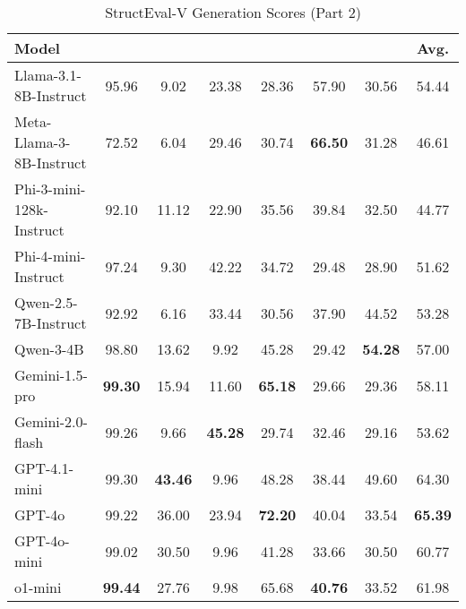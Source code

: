 \begin{table*}[ht]
\centering
\scriptsize
\begin{tabular*}{\textwidth}{@{\extracolsep{\fill}}l*{6}{S[table-format=3.2]}S[table-format=3.2]}
\toprule
\textbf{Model} &
 &
 &
 &
  &
   &
 &
\textbf{Avg.}\\
\midrule
Llama-3.1-8B-Instruct   & 95.96 &  9.02 & 23.38 & 28.36 & 57.90 & 30.56 & 54.44 \\
Meta-Llama-3-8B-Instruct& 72.52 &  6.04 & 29.46 & 30.74 & \textbf{66.50} & 31.28 & 46.61 \\
Phi-3-mini-128k-Instruct& 92.10 & 11.12 & 22.90 & 35.56 & 39.84 & 32.50 & 44.77 \\
Phi-4-mini-Instruct      & 97.24 &  9.30 & 42.22 & 34.72 & 29.48 & 28.90 & 51.62 \\
Qwen-2.5-7B-Instruct     & 92.92 &  6.16 & 33.44 & 30.56 & 37.90 & 44.52 & 53.28 \\
Qwen-3-4B              & 98.80 & 13.62 &  9.92 & 45.28 & 29.42 & \textbf{54.28} & 57.00 \\
Gemini-1.5-pro         & \textbf{99.30} & 15.94 & 11.60 & \textbf{65.18} & 29.66 & 29.36 & 58.11 \\
Gemini-2.0-flash       & 99.26 &  9.66 & \textbf{45.28} & 29.74 & 32.46 & 29.16 & 53.62 \\
GPT-4.1-mini           & 99.30 & \textbf{43.46} &  9.96 & 48.28 & 38.44 & 49.60 & 64.30 \\
GPT-4o                 & 99.22 & 36.00 & 23.94 & \textbf{72.20} & 40.04 & 33.54 & \textbf{65.39} \\
GPT-4o-mini            & 99.02 & 30.50 &  9.96 & 41.28 & 33.66 & 30.50 & 60.77 \\
o1-mini                & \textbf{99.44} & 27.76 &  9.98 & 65.68 & \textbf{40.76} & 33.52 & 61.98 \\
\bottomrule
\end{tabular*}
\caption{StructEval-V Generation Scores (Part 2)}
\label{tab:structeval_v_gen_b}
\end{table*}


